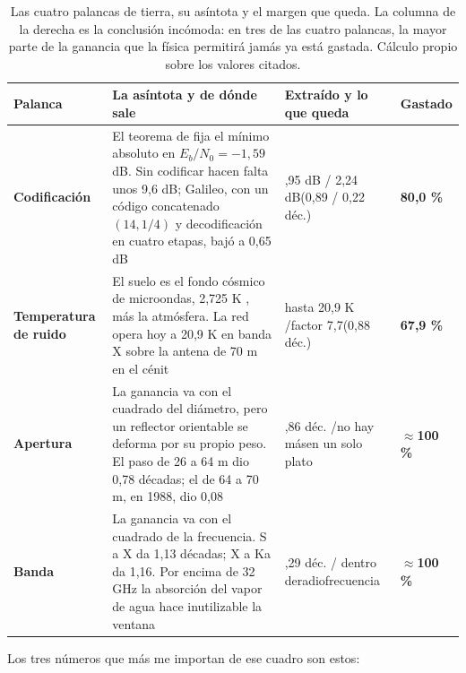\documentclass[11pt,letterpaper]{article}
\begin{document}
\begin{table}[t]
\small
\caption{Las cuatro palancas de tierra, su asíntota y el margen que queda. La
columna de la derecha es la conclusión incómoda: en tres de las cuatro
palancas, la mayor parte de la ganancia que la física permitirá jamás ya está
gastada. Cálculo propio sobre los valores citados.}
\label{cuadro:asintotas}
\begin{tabularx}{\textwidth}{@{}p{2.4cm}X>{\raggedright\arraybackslash}p{2.6cm}>{\raggedleft\arraybackslash}p{1.65cm}@{}}
\toprule
\textbf{Palanca} & \textbf{La asíntota y de dónde sale} &
\textbf{Extraído y lo que queda} & \textbf{Gastado} \\
\midrule
\textbf{Codificación}
& El teorema de \textcite{shannon1948} fija el mínimo absoluto en
  $E_b/N_0 = -1{,}59$ dB. Sin codificar hacen falta unos 9,6 dB; Galileo, con
  un código concatenado $(14,1/4)$ y decodificación en cuatro etapas, bajó a
  0,65 dB \parencite{layland1997}
& 8,95 dB / 2,24 dB\newline (0,89 / 0,22 déc.)
& \textbf{80,0 \%} \\
\addlinespace[2pt]
\textbf{Temperatura de ruido}
& El suelo es el fondo cósmico de microondas, 2,725 K \parencite{fixsen2009},
  más la atmósfera. La red opera hoy a 20,9 K en banda X sobre la antena de
  70 m en el cénit \parencite{layland1997}
& hasta 20,9 K /\newline factor 7,7\newline (0,88 déc.)
& \textbf{67,9 \%} \\
\addlinespace[2pt]
\textbf{Apertura}
& La ganancia va con el cuadrado del diámetro, pero un reflector orientable se
  deforma por su propio peso. El paso de 26 a 64 m dio 0,78 décadas; el de 64
  a 70 m, en 1988, dio 0,08
& 0,86 déc. /\newline no hay más\newline en un solo plato
& \textbf{$\approx$100 \%} \\
\addlinespace[2pt]
\textbf{Banda}
& La ganancia va con el cuadrado de la frecuencia. S a X da 1,13 décadas; X a
  Ka da 1,16. Por encima de 32 GHz la absorción del vapor de agua hace
  inutilizable la ventana
& 2,29 déc. /\newline 0 dentro de\newline radiofrecuencia
& \textbf{$\approx$100 \%} \\
\bottomrule
\end{tabularx}
\end{table}

Los tres números que más me importan de ese cuadro son estos:
\end{document}
